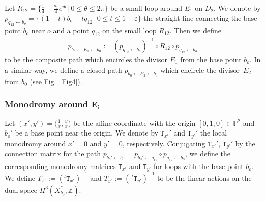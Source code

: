 \documentclass[pdftex]{sigma}
\numberwithin{equation}{section}
\begin{document}
\begin{Definition} Let $R_{12}=\big\{ \frac{1}{4}+\frac{s_{1}}{4}e^{i\theta}\,|\,0\leq\theta\leq2\pi\big\} $ be a small loop around $E_{1}$ on $D_{2}$. We denote by $p_{q_{12}\leftarrow b_{o}}= \{ (1-t)b_{o}+tq_{12}\,|\,0\leq t\leq1-\varepsilon \} $ the straight line connecting the base point $b_{o}$ near $o$ and a point $q_{12}$ on the small loop $R_{12}$. Then we define
\begin{gather*}
p_{b_{o}\leftarrow E_{1}\leftarrow b_{0}}:=(p_{q_{12}\leftarrow b_{o}})^{-1}\circ R_{12}\circ p_{q_{12}\leftarrow b_{o}}
\end{gather*}
to be the composite path which encircles the divisor $E_{1}$ from the base point $b_{o}$. In a similar way, we define a closed path $p_{b_{0}\leftarrow E_{2}\leftarrow b_{o}}$ which encircle the divisor~$E_{2}$ from $b_{0}$ (see Fig.~\ref{Fig4}).

\subsubsection[Monodromy around $E_i$]{Monodromy around $\boldsymbol{E_i}$} \label{para:monod-Ei-p3p3}

Let $(x',y')=\big(\frac{1}{x},\frac{y}{x}\big)$ be the affine coordinate with the origin $[0,1,0]\in\mathbb{P}^{2}$ and $b_{o}'$ be a base point near the origin. We denote by $\mathtt{T}_{x'}'$ and $\mathtt{T}_{y'}'$ the local monodromy around $x'=0$ and $y'=0$, respectively. Conjugating $\mathtt{T}_{x'}'$, $\mathtt{T}_{y'}'$ by the connection matrix for the path $p_{b_{o}'\leftarrow b_{0}}=p_{b_{0}'\leftarrow q_{12}}\circ p_{q_{12}\leftarrow b_{o}}$, we define the corresponding monodromy matrices $\mathtt{T}_{x'}$ and $\mathtt{T}_{y'}$ for loops with the base point $b_{o}$. We define $T_{x'}:=(^{t}\mathtt{T}_{x'})^{-1}$ and $T_{y'}:=(\,^{t}\mathtt{T}_{y'})^{-1}$ to be the linear actions on the dual space $H^{3}(X_{b_{o}}^{*},\mathbb{Z})$. \end{Definition}
\end{document}
